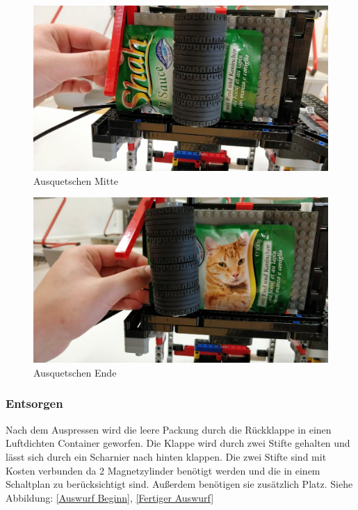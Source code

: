 \begin{figure}[H]
\begin{center}
\includegraphics[width=13cm]{Bilder/Ablauf_1_png/Ausquetschen_2}
\caption{Ausquetschen Mitte}
\label{Ausquetschen Mitte}
\end{center}
\end{figure}

\begin{figure}[H]
\begin{center}
\includegraphics[width=13cm]{Bilder/Ablauf_1_png/Ausquetschen_3}
\caption{Ausquetschen Ende}
\label{Ausquetschen Ende}
\end{center}
\end{figure}
\newpage
\subsubsection{Entsorgen}

Nach dem Auspressen wird die leere Packung durch die Rückklappe in einen Luftdichten Container geworfen. Die Klappe wird durch zwei Stifte gehalten und lässt sich durch ein Scharnier nach hinten klappen. Die zwei Stifte sind mit Kosten verbunden da 2 Magnetzylinder benötigt werden und die in einem Schaltplan zu berücksichtigt sind. Außerdem benötigen sie zusätzlich Platz. Siehe Abbildung: \ref{Auswurf Beginn}, \ref{Fertiger Auswurf}

